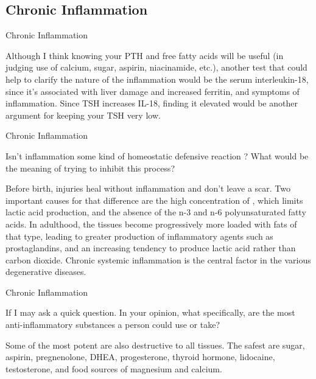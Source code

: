 \documentclass[11pt,oneside,openany,extrafontsizes]{memoir}
\begin{document}
\subsection{Chronic Inflammation}

\begin{standalonequote}{Chronic Inflammation}

    \begin{answer}
        Although I think knowing your PTH and free fatty acids will be useful (in judging use of calcium, sugar, aspirin, niacinamide, etc.), another test that could help to clarify the nature of the inflammation would be the serum interleukin-18, since it's associated with liver damage and increased ferritin, and symptoms of inflammation. Since TSH increases IL-18, finding it elevated would be another argument for keeping your TSH very low.
    \end{answer}
\end{standalonequote}

\begin{qaexchange}{Chronic Inflammation}

    \begin{question}
        Isn't inflammation some kind of homeostatic defensive reaction ? What would be the meaning of trying to inhibit this process?
    \end{question}

    \begin{answer}
        Before birth, injuries heal without inflammation and don't leave a scar. Two important causes for that difference are the high concentration of , which limits lactic acid production, and the absence of the n-3 and n-6 polyunsaturated fatty acids. In adulthood, the tissues become progressively more loaded with fats of that type, leading to greater production of inflammatory agents such as prostaglandins, and an increasing tendency to produce lactic acid rather than carbon dioxide. Chronic systemic inflammation is the central factor in the various degenerative diseases.
    \end{answer}
\end{qaexchange}

\begin{qaexchange}{Chronic Inflammation}

    \begin{question}
         If I may ask a quick question. In your opinion, what specifically, are the most anti-inflammatory substances a person could use or take?
    \end{question}

    \begin{answer}
      Some of the most potent are also destructive to all tissues. The safest are sugar, aspirin, pregnenolone, DHEA, progesterone, thyroid hormone, lidocaine, testosterone, and food sources of magnesium and calcium.
    \end{answer}
\end{qaexchange}
\end{document}
